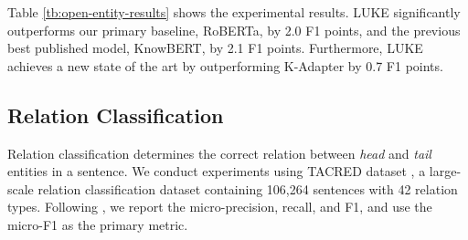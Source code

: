 \documentclass[11pt,a4paper]{article}
\begin{document}
\begin{table}[t]
    \centering
    \setlength{\tabcolsep}{4pt}
    \caption{Results of entity typing on the Open Entity dataset.}
    \label{tb:open-entity-results}
\end{table}

Table \ref{tb:open-entity-results} shows the experimental results.
LUKE significantly outperforms our primary baseline, RoBERTa, by 2.0 F1 points, and the previous best published model, KnowBERT, by 2.1 F1 points.
Furthermore, LUKE achieves a new state of the art by outperforming K-Adapter by 0.7 F1 points.

\subsection{Relation Classification}

Relation classification determines the correct relation between \textit{head} and \textit{tail} entities in a sentence.
We conduct experiments using TACRED dataset \cite{Zhang2017Position-awareFilling}, a large-scale relation classification dataset containing 106,264 sentences with 42 relation types.
Following , we report the micro-precision, recall, and F1, and use the micro-F1 as the primary metric.
\end{document}
